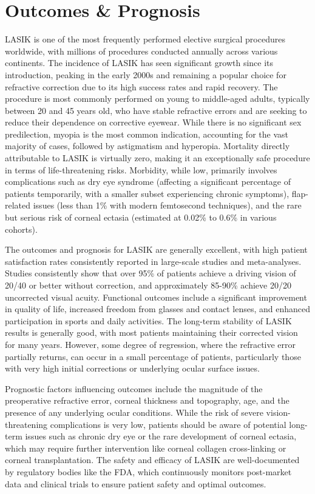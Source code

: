 \section*{Outcomes \& Prognosis}
LASIK is one of the most frequently performed elective surgical procedures worldwide, with millions of procedures conducted annually across various continents. The incidence of LASIK has seen significant growth since its introduction, peaking in the early 2000s and remaining a popular choice for refractive correction due to its high success rates and rapid recovery. The procedure is most commonly performed on young to middle-aged adults, typically between 20 and 45 years old, who have stable refractive errors and are seeking to reduce their dependence on corrective eyewear. While there is no significant sex predilection, myopia is the most common indication, accounting for the vast majority of cases, followed by astigmatism and hyperopia. Mortality directly attributable to LASIK is virtually zero, making it an exceptionally safe procedure in terms of life-threatening risks. Morbidity, while low, primarily involves complications such as dry eye syndrome (affecting a significant percentage of patients temporarily, with a smaller subset experiencing chronic symptoms), flap-related issues (less than 1\% with modern femtosecond techniques), and the rare but serious risk of corneal ectasia (estimated at 0.02\% to 0.6\% in various cohorts).

The outcomes and prognosis for LASIK are generally excellent, with high patient satisfaction rates consistently reported in large-scale studies and meta-analyses. Studies consistently show that over 95\% of patients achieve a driving vision of 20/40 or better without correction, and approximately 85-90\% achieve 20/20 uncorrected visual acuity. Functional outcomes include a significant improvement in quality of life, increased freedom from glasses and contact lenses, and enhanced participation in sports and daily activities. The long-term stability of LASIK results is generally good, with most patients maintaining their corrected vision for many years. However, some degree of regression, where the refractive error partially returns, can occur in a small percentage of patients, particularly those with very high initial corrections or underlying ocular surface issues.

Prognostic factors influencing outcomes include the magnitude of the preoperative refractive error, corneal thickness and topography, age, and the presence of any underlying ocular conditions. While the risk of severe vision-threatening complications is very low, patients should be aware of potential long-term issues such as chronic dry eye or the rare development of corneal ectasia, which may require further intervention like corneal collagen cross-linking or corneal transplantation. The safety and efficacy of LASIK are well-documented by regulatory bodies like the FDA, which continuously monitors post-market data and clinical trials to ensure patient safety and optimal outcomes.

